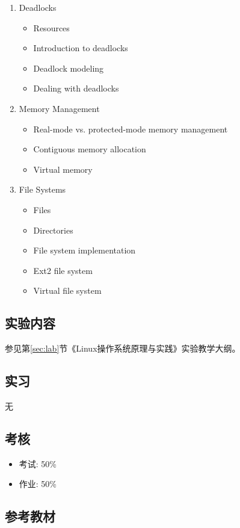 \documentclass{wx672ctexart}
\begin{document}
\begin{enumerate}
\item Deadlocks
  \begin{itemize}
  \item Resources
  \item Introduction to deadlocks
  \item Deadlock modeling
  \item Dealing with deadlocks
  \end{itemize}
\item Memory Management
  \begin{itemize}
  \item Real-mode vs. protected-mode memory management
  \item Contiguous memory allocation
  \item Virtual memory
  \end{itemize}
\item File Systems
  \begin{itemize}
  \item Files
  \item Directories
  \item File system implementation
  \item Ext2 file system
  \item Virtual file system
  \end{itemize}
\end{enumerate}

\subsection{实验内容}
\label{sec-1-2}

参见第\ref{sec:lab}节《Linux操作系统原理与实践》实验教学大纲。

\subsection{实习}
\label{sec-1-3}

无

\subsection{考核}
\label{sec-1-4}

\begin{itemize}
\item 考试: 50\%
\item 作业: 50\%
\end{itemize}

\subsection{参考教材}
\label{sec-1-5}
\end{document}
